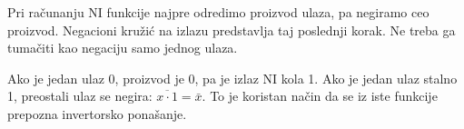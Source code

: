
Pri računanju NI funkcije najpre odredimo proizvod ulaza, pa negiramo ceo proizvod. Negacioni kružić na izlazu predstavlja taj poslednji korak. Ne treba ga tumačiti kao negaciju samo jednog ulaza.

Ako je jedan ulaz 0, proizvod je 0, pa je izlaz NI kola 1. Ako je jedan ulaz stalno 1, preostali ulaz se negira: \(\overline{x\cdot1}=\bar{x}\). To je koristan način da se iz iste funkcije prepozna invertorsko ponašanje.
